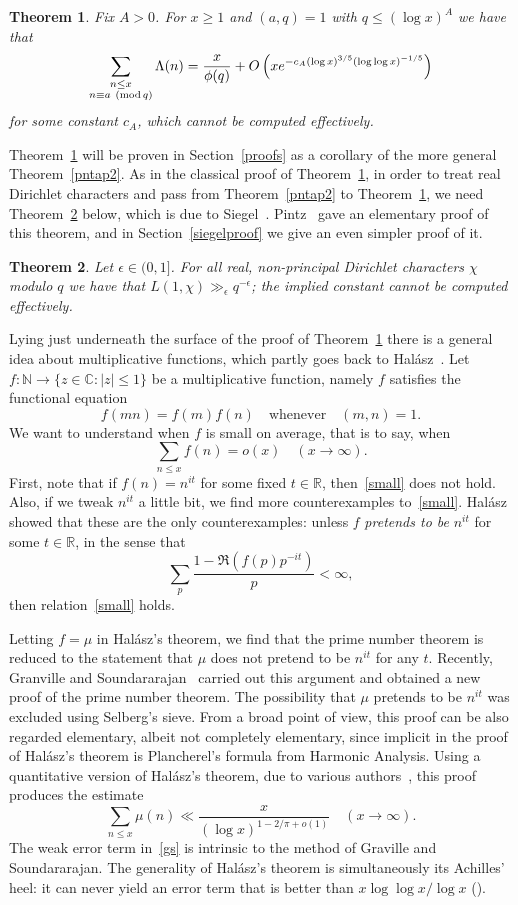 \documentclass[12pt]{amsart}
\newtheorem{theorem}{Theorem}[section]
\theoremstyle{remark}
\newcommand {\SN} {{\mathbb N}}
\newcommand {\SR} {{\mathbb R}}
\newcommand {\SC} {{\mathbb C}}
\newcommand{\be}{\begin{equation}}
\newcommand{\ee}{\end{equation}}
\numberwithin{equation}{section}
\renewcommand{\pmod}[1]{~({\rm mod}\,#1)}
\begin{document}
\begin{theorem}\label{pntap} Fix $A>0$. For $x\ge1$ and $(a,q)=1$ with $q\le(\log x)^A$ we have that
$$
\sum_{\substack{n\le x\\n\equiv a\pmod q}}\Lambda(n)=\frac x{\phi(q)}+O\left(xe^{-c_A(\log x)^{3/5}(\log\log x)^{-1/5}}\right)
$$
for some constant $c_A$, which cannot be computed effectively.
\end{theorem}

Theorem~\ref{pntap} will be proven in Section~\ref{proofs} as a corollary of the more general Theorem~\ref{pntap2}. As in the classical proof of Theorem~\ref{pntap}, in order to treat real Dirichlet characters and pass from Theorem~\ref{pntap2} to Theorem~\ref{pntap}, we need Theorem~\ref{siegel} below, which is due to Siegel~\cite{Si}. Pintz~\cite{Pi73} gave an elementary proof of this theorem, and in Section~\ref{siegelproof} we give an even simpler proof of it.

\begin{theorem}\label{siegel} Let $\epsilon\in(0,1]$. For all real, non-principal Dirichlet characters $\chi$ modulo $q$ we have that $L(1,\chi)\gg_\epsilon q^{-\epsilon}$; the implied constant cannot be computed effectively.
\end{theorem}

Lying just underneath the surface of the proof of Theorem~\ref{pntap} there is a general idea about multiplicative functions, which partly goes back to Hal\'asz~\cite{hal2,hal3}. Let $f:\SN\to\{z\in\SC:|z|\le1\}$ be a multiplicative function, namely $f$ satisfies the functional equation $$
f(mn)=f(m)f(n)\quad\text{whenever}\quad(m,n)=1.
$$
We want to understand when $f$ is small on average, that is to say, when
\be\label{small}
\sum_{n\le x}f(n)=o(x)\quad(x\to\infty).
\ee
First, note that if $f(n)=n^{it}$ for some fixed $t\in\SR$, then~\eqref{small} does not hold. Also, if we tweak $n^{it}$ a little bit, we find more counterexamples to~\eqref{small}. Hal\'asz showed that these are the only counterexamples: unless $f$ \textit{pretends to be} $n^{it}$ for some $t\in\SR$, in the sense that
$$
\sum_p\frac{1-\Re(f(p)p^{-it})}p<\infty,
$$
then relation~\eqref{small} holds.

Letting $f=\mu$ in Hal\'asz's theorem, we find that the prime number theorem is reduced to the statement that $\mu$ does not pretend to be $n^{it}$ for any $t$. Recently, Granville and Soundararajan~\cite{gs} carried out this argument and obtained a new proof of the prime number theorem. The possibility that $\mu$ pretends to be $n^{it}$ was excluded using Selberg's sieve. From a broad point of view, this proof can be also regarded elementary, albeit not completely elementary, since implicit in the proof of Hal\'asz's theorem is Plancherel's formula from Harmonic Analysis. Using a quantitative version of Hal\'asz's theorem, due to various authors~\cite{mont,ten,gs1}, this proof produces the estimate
\be\label{gs}
\sum_{n\le x}\mu(n)\ll\frac x{(\log x)^{1-2/\pi+o(1)}}\quad(x\to\infty).
\ee
The weak error term in~\eqref{gs} is intrinsic to the method of Graville and Soundararajan. The generality of Hal\'asz's theorem is simultaneously its Achilles' heel: it can never yield an error term that is better than $x\log\log x/\log x$ (\cite{mv2,gs}).
\end{document}
